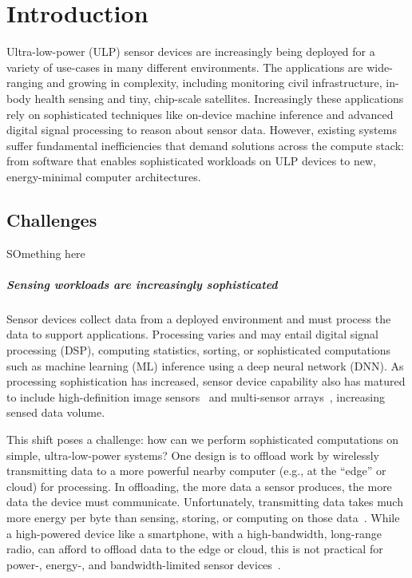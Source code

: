 \chapter{Introduction}
\label{chapter:intro}
% 
Ultra-low-power (ULP) sensor devices are increasingly being deployed for a variety of use-cases in many different environments. 
% 
The applications are wide-ranging and growing in complexity, including monitoring civil infrastructure, in-body health sensing and tiny, chip-scale satellites.
Increasingly these applications rely on sophisticated techniques like on-device machine inference and advanced digital signal processing to reason about sensor data.
% 
However, existing systems suffer fundamental inefficiencies that demand solutions across the compute stack: from software that enables sophisticated workloads on ULP devices to new, energy-minimal computer architectures.

\section{Challenges}
SOmething here

\paragraph{Sensing workloads are increasingly sophisticated}
Sensor devices collect data from a deployed environment and must process the 
data to support applications.  Processing varies and may entail digital signal
processing (DSP), computing statistics, sorting, or sophisticated computations
such as machine learning (ML) inference using a deep neural network (DNN).
%
As processing sophistication has increased, sensor device capability also
has matured to include high-definition image sensors~\cite{naderiparizi2018towards} and
multi-sensor arrays~\cite{laput2017synthetic}, increasing sensed data volume. 

This shift poses a challenge: how can we perform sophisticated computations
on simple, ultra-low-power systems?
One design is 
to offload work by wirelessly transmitting data to a more powerful
nearby computer (e.g., at the ``edge'' or cloud) for processing.  
%
In offloading, the more data a sensor produces, the more data the device must
communicate. 
%
Unfortunately, transmitting data takes much more energy per byte than
sensing, storing, or computing on those data~\cite{sonic,zebranet}.  
%
While a high-powered device like a smartphone, with a high-bandwidth,
long-range radio, can afford to offload data to the edge or cloud,
this is not practical for power-, energy-, and bandwidth-limited sensor devices~\cite{dongare2017openchirp,sonic}.

